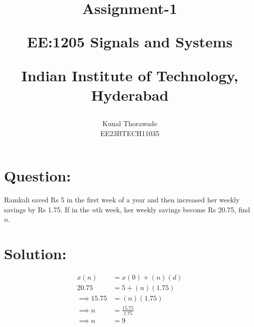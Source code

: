 \documentclass[journal,12pt,twocolumn]{IEEEtran}
\theoremstyle{remark}
\begin{document}
%




\vspace{3cm}

\title{
Assignment-1 

\large{EE:1205 Signals and Systems}

Indian Institute of Technology, Hyderabad
}
\author{Kunal Thorawade

EE23BTECH11035
}	

\maketitle


\newpage


\bigskip
 
\renewcommand{\thefigure}{\theenumi}
\renewcommand{\thetable}{\theenumi}
\begin{flushleft}

\section{\Large Question:}  Ramkali saved Rs 5 in the first week of a year and then increased her weekly savings by Rs 1.75. If in the $n$th week, her weekly savings become Rs 20.75, find $n$.

\section{\Large Solution:} 


\end{flushleft}
\begin{center}

\begin{align} 
x(n) &= x(0) + (n)(d)
\\ 20.75 &= 5 + (n)(1.75)  
\\ \implies 15.75 &= (n)(1.75)
\\ \implies n &= \frac{15.75}{1.75}
\\ \implies n &= 9
\end{align}
\end{center}
\end{document}
